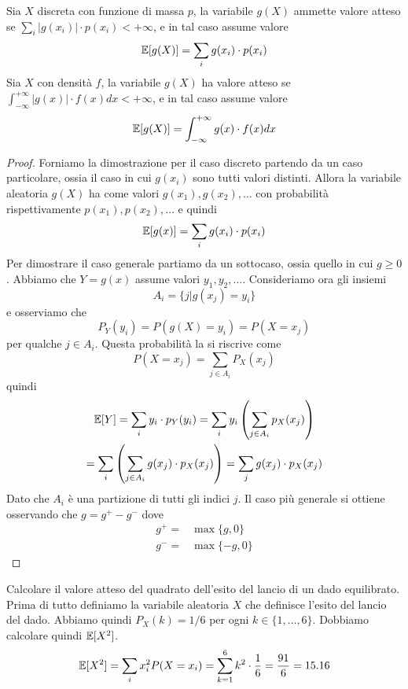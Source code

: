 \begin{proposition}
	Sia $X$ discreta con funzione di massa $p$, la variabile $g(X)$ ammette valore atteso se
	$\sum_i |g(x_i)| \cdot p(x_i) < +\infty$, e in tal caso assume valore
	\[ \mathbb{E}[g(X)] = \sum_i g(x_i) \cdot p(x_i) \]
	Sia $X$ con densità $f$, la variabile $g(X)$ ha valore atteso se
	$\int_{-\infty}^{+\infty} |g(x)| \cdot f(x) dx < +\infty$, e in tal caso assume valore
	\[ \mathbb{E}[g(X)] = \int_{-\infty}^{+\infty} g(x) \cdot f(x) dx \]
	\begin{proof}
		Forniamo la dimostrazione per il caso discreto partendo da un caso particolare, ossia il
		caso in cui $g(x_i)$ sono tutti valori distinti. Allora la variabile aleatoria $g(X)$ ha
		come valori $g(x_1), g(x_2), \dots$ con probabilità rispettivamente $p(x_1), p(x_2), \dots$
		e quindi
		\[ \mathbb{E}[g(x)] = \sum_i g(x_i) \cdot p(x_i) \]
		Per dimostrare il caso generale partiamo da un sottocaso, ossia quello in cui $g \geq 0$.
		Abbiamo che $Y = g(x)$ assume valori $y_1, y_2, \dots$. Consideriamo ora gli insiemi
		\[ A_i = \{ j | g(x_j) = y_i \} \]
		e osserviamo che
		\[ P_Y(y_i) = P(g(X) = y_i) = P(X = x_j) \]
		per qualche $j \in A_i$. Questa probabilità la si riscrive come
		\[ P(X = x_j) = \sum_{j \in A_i} P_X (x_j) \]
		quindi
		\begin{multline*}
			\mathbb{E}[Y] = \sum_i y_i \cdot p_Y(y_i) =
			\sum_i y_i \left( \sum_{j \in A_i} p_X(x_j) \right) \\
			= \sum_i \left( \sum_{j \in A_i} g(x_j) \cdot p_X (x_j) \right) =
			\sum_j g(x_j) \cdot p_X (x_j)
		\end{multline*}
		Dato che $A_i$ è una partizione di tutti gli indici $j$. Il caso più generale si ottiene
		osservando che $g = g^+ - g^-$ dove
		\begin{align*}
			g^+ = & \max \{g,0\} \\
			g^- = & \max\{-g,0\}
		\end{align*}
	\end{proof}
\end{proposition}

\begin{example}
	Calcolare il valore atteso del quadrato dell'esito del lancio di un dado equilibrato. Prima di
	tutto definiamo la variabile aleatoria $X$ che definisce l'esito del lancio del dado. Abbiamo
	quindi $P_X(k) = 1/6$ per ogni $k \in \{1, \dots, 6\}$. Dobbiamo calcolare quindi $\mathbb{E}[X^2]$.
	\[
		\mathbb{E}[X^2] = \sum_i x_i^2 P(X = x_i) = \sum_{k=1}^6 k^2 \cdot \frac{1}{6}
		= \frac{91}{6} = 15.16
	\]
\end{example}

